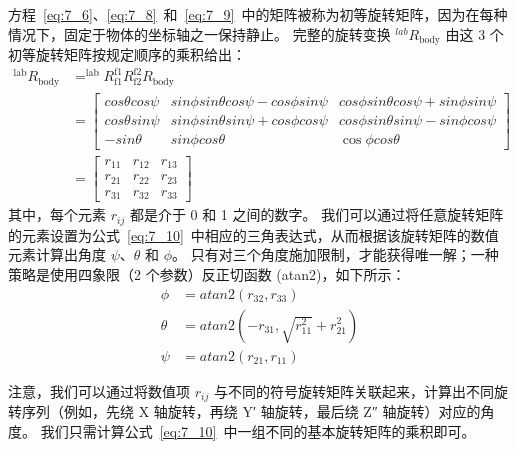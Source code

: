 方程~\ref{eq:7_6}、\ref{eq:7_8}~和~\ref{eq:7_9}~中的矩阵被称为初等旋转矩阵，因为在每种情况下，固定于物体的坐标轴之一保持静止。
完整的旋转变换 $^{lab}R_\text{body}$ 由这 3 个初等旋转矩阵按规定顺序的乘积给出：
%
\begin{equation}
	\begin{aligned}
		^\text{lab} R_\text{body} & = 
			^\text{lab} R_\text{f1}
			^\text{f1} R_\text{f2}
			^\text{f2} R_\text{body} \\
		& = \begin{bmatrix}
			cos \theta cos \psi & 
			sin \phi sin \theta cos \psi - cos \phi sin \psi &
			cos \phi sin \theta cos \psi + sin \phi sin \psi \\
			cos \theta sin \psi &
			sin \phi sin \theta sin \psi + cos \phi cos \psi &
			cos \phi sin \theta sin \psi - sin \phi cos \psi \\
			- sin \theta &  sin \phi cos \theta &  \cos \phi cos \theta
		\end{bmatrix} \\
		& = \begin{bmatrix}
			r_{11}  & r_{12}  & r_{13} \\
			r_{21}  & r_{22}  & r_{23} \\
			r_{31}  & r_{32}  & r_{33}
		\end{bmatrix}
	\end{aligned}
	\label{eq:7_10}
\end{equation}
%
其中，每个元素 $r_{ij}$ 都是介于 0 和 1 之间的数字。
我们可以通过将任意旋转矩阵的元素设置为公式~\ref{eq:7_10}~中相应的三角表达式，从而根据该旋转矩阵的数值元素计算出角度 $\psi$、$\theta$ 和 $\phi$。
只有对三个角度施加限制，才能获得唯一解；一种策略是使用四象限（2 个参数）反正切函数 (atan2)，如下所示：
%
\begin{equation}
	\begin{aligned}
		\phi & = atan2(r_{32}, r_{33}) \\
		\theta & = atan2(-r_{31}, \sqrt{r_{11}^2} + r_{21}^2) \\
		\psi & = atan2(r_{21}, r_{11})
	\end{aligned}
	\label{eq:7_11}
\end{equation}


注意，我们可以通过将数值项 $r_{ij}$ 与不同的符号旋转矩阵关联起来，计算出不同旋转序列（例如，先绕 X 轴旋转，再绕 Y′ 轴旋转，最后绕 Z″ 轴旋转）对应的角度。
我们只需计算公式~\ref{eq:7_10}~中一组不同的基本旋转矩阵的乘积即可。


